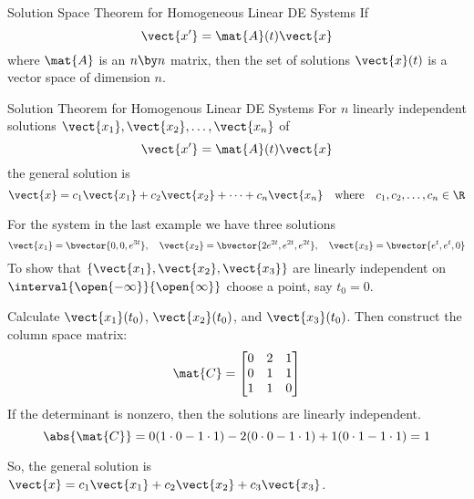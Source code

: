 \documentclass{beamer}
\begin{document}
\begin{frame}
\begin{block}{Solution Space Theorem for Homogeneous Linear DE Systems}
If
\begin{equation*}
\vect{x^\prime}=\mat{A}(t)\vect{x}
\end{equation*}
where $\mat{A}$ is an $n\by n$ matrix, then the set of solutions $\vect{x}(t)$ is a vector space of dimension $n$.
\end{block}\pause
\begin{block}{Solution Theorem for Homogenous Linear DE Systems}
For $n$ linearly independent solutions $\vect{x_1},\vect{x_2},\ldots,\vect{x_n}$ of
\begin{equation*}
\vect{x^\prime}=\mat{A}(t)\vect{x}
\end{equation*}
the general solution is
\begin{equation*}
\vect{x}=c_1\vect{x_1}+c_2\vect{x_2}+\cdots+c_n\vect{x_n}
\quad\text{where}\quad
c_1,c_2,\ldots,c_n\in\R
\end{equation*}
\end{block}
\end{frame}

\begin{frame}
\begin{example}
For the system in the last example we have three solutions
\begin{equation*}
\vect{x_1}=\bvector{0,0,e^{3t}}
,\quad
\vect{x_2}=\bvector{2e^{2t},e^{2t},e^{2t}}
,\quad
\vect{x_3}=\bvector{e^t,e^t,0}
\end{equation*}\pause
To show that $\{\vect{x_1}, \vect{x_2}, \vect{x_3}\}$ are linearly independent on $\interval{\open{-\infty}}{\open{\infty}}$ choose a point, say $t_0=0$.\pause

\vspace{2mm}
Calculate $\vect{x_1}(t_0)$, $\vect{x_2}(t_0)$, and $\vect{x_3}(t_0)$. Then construct the column space matrix:
\begin{equation*}
\mat{C}=
\begin{bmatrix}
0&2&1\\
0&1&1\\
1&1&0\\
\end{bmatrix}
\end{equation*}\pause
If the determinant is nonzero, then the solutions are linearly independent.\pause
\begin{equation*}
\abs{\mat{C}}=0(1\cdot 0- 1\cdot 1)-2(0\cdot 0-1\cdot 1)+1(0\cdot 1-1\cdot 1)=1
\end{equation*}\pause

\vspace{-7mm}
So, the general solution is $\vect{x}=c_1\vect{x_1}+c_2\vect{x_2}+c_3\vect{x_3}$.
\end{example}
\end{frame}
\end{document}
